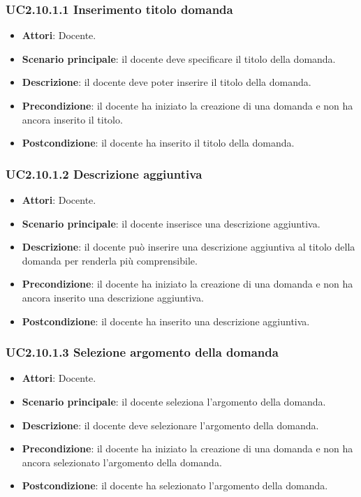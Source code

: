 \subsubsection{UC2.10.1.1 Inserimento titolo domanda}
\begin{itemize}
\item \textbf{Attori}: Docente.
\item \textbf{Scenario principale}: il docente deve specificare il titolo della domanda.
\item \textbf{Descrizione}: il docente deve poter inserire il titolo della domanda.
\item \textbf{Precondizione}: il docente ha iniziato la creazione di una domanda e non ha ancora inserito il titolo.
\item \textbf{Postcondizione}: il docente ha inserito il titolo della domanda.
\end{itemize}
\subsubsection{UC2.10.1.2 Descrizione aggiuntiva}
\begin{itemize}
\item \textbf{Attori}: Docente.
\item \textbf{Scenario principale}: il docente inserisce una descrizione aggiuntiva.
\item \textbf{Descrizione}: il docente può inserire una descrizione aggiuntiva al titolo della domanda per renderla più comprensibile.
\item \textbf{Precondizione}: il docente ha iniziato la creazione di una domanda e non ha ancora inserito una descrizione aggiuntiva.
\item \textbf{Postcondizione}: il docente ha inserito una descrizione aggiuntiva.
\end{itemize}
\subsubsection{UC2.10.1.3 Selezione argomento della domanda}
\begin{itemize}
\item \textbf{Attori}: Docente.
\item \textbf{Scenario principale}: il docente seleziona l'argomento della domanda.
\item \textbf{Descrizione}: il docente deve selezionare l'argomento della domanda.
\item \textbf{Precondizione}: il docente ha iniziato la creazione di una domanda e non ha ancora selezionato l'argomento della domanda.
\item \textbf{Postcondizione}: il docente ha selezionato l'argomento della domanda.
\end{itemize}
